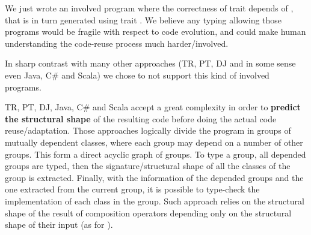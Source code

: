 We just wrote an involved program where the correctness of trait \Q@t@ depends of 
\Q@A@, that is in turn generated using trait \Q@t@.
We believe any typing allowing those programs would be fragile with respect to code evolution,
and could make human understanding the code-reuse process much harder/involved.


In sharp contrast with
many other approaches (TR, PT, DJ and in some sense even Java, C\# and Scala)
we chose to not support this kind of involved programs.

TR, PT, DJ, Java, C\# and Scala
accept a great complexity in order to \textbf{predict the structural shape} of the resulting code before doing the actual code reuse/adaptation.
Those approaches logically divide the program in groups of mutually dependent classes, where each group may depend on a number of other groups.
This form a direct acyclic graph of groups.
To type a group, all depended groups are typed, then
the signature/structural shape of all
the classes of the group is extracted.
Finally, with the information of the depended groups and the one extracted
from the current group, it is possible to type-check the implementation of each class in the group.
Such approach relies on the structural shape of the result of composition operators depending only on the
structural shape of their input (as for \use).




